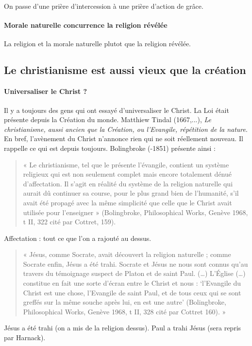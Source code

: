 On passe d'une prière d'intercession à une prière d'action de grâce. 

\paragraph{Morale naturelle concurrence la religion révélée} La religion et la morale naturelle plutot que la religion révélée.

 
\subsection{Le christianisme est aussi vieux que la création}

\paragraph{Universaliser le Christ ?} Il y a toujours des gens qui ont essayé d'universaliser le Christ. La Loi était présente depuis la Création du monde. Matthiew Tindal (1667,...), \textit{Le christianisme, aussi ancien que la Création, ou l'Evangile, répétition de la nature}. En bref, l'avènement du Christ n'annonce rien qui ne soit réellement nouveau. Il rappelle ce qui est depuis toujours. Bolingbroke (-1851) présente ainsi : 
 \begin{quote}
    « Le christianisme, tel que le présente l’évangile, contient un système religieux qui est non
seulement complet mais encore totalement dénué d’affectation. Il s’agit en réalité du système
de la religion naturelle qui aurait dû continuer sa course, pour le plus grand bien de
l’humanité, s’il avait été propagé avec la même simplicité que celle que le Christ avait utilisée
pour l’enseigner » (Bolingbroke, Philosophical Works, Genève 1968, t II, 322 cité par Cottret,
159).
\end{quote}
Affectation : tout ce que l'on a rajouté au dessus. 

\begin{quote}
« Jésus, comme Socrate, avait découvert la religion naturelle ; comme Socrate enfin, Jésus a
été trahi. Socrate et Jésus ne nous sont connus qu’au travers du témoignage suspect de Platon
et de saint Paul. (…) L’Église (…) constitue en fait une sorte d’écran entre le Christ et nous :
‘l’Evangile du Christ est une chose, l’Evangile de saint Paul, et de tous ceux qui se sont
greffés sur la même souche après lui, en est une autre’ (Bolingbroke, Philosophical Works,
Genève 1968, t II, 328 cité par Cottret 160). »
    
\end{quote}
Jésus a été trahi (on a mis de la religion dessus). Paul a trahi Jésus (sera repris par Harnack). 

